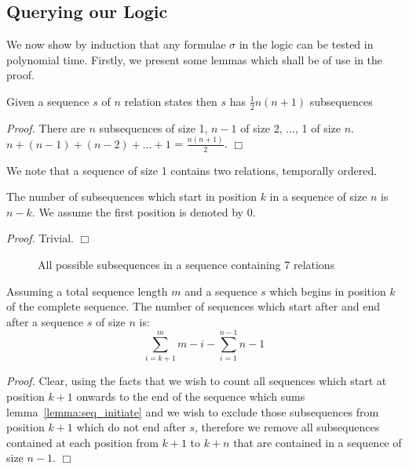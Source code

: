 \subsection{Querying our Logic}

We now show by induction that any formulae $\sigma$ in the logic can be tested
in polynomial time. Firstly, we present some lemmas which shall be of use
in the proof.


\begin{lemma}\label{lemma:subseq}
\begin{rm}
Given a sequence $s$ of $n$ relation states then $s$ has $\frac{1}{2}
n(n+1)$ subsequences
\end{rm}
\end{lemma}

{\em Proof.} There are $n$ subsequences of size 1, $n-1$ of size 2,
$\ldots$, 1 of size $n$. $n + (n-1) + (n-2) + \ldots + 1$ = $\frac{n(n+1)}{2}$. $\Box$

We note that a sequence of size 1 contains two relations, temporally
ordered. 
\begin{lemma}\label{lemma:seq_initiate}
\begin{rm}
The number of subsequences which start in position $k$ in
a sequence of size $n$ is $n-k$. We assume the first position is
denoted by 0.
\end{rm}
\end{lemma}

{\em Proof.} Trivial. $\Box$


\begin{figure}[ht]
\centerline{}
\caption{\label{fig:sequence} All possible subsequences in a sequence
containing 7 relations}
\end{figure}


\begin{lemma}\label{lemma:seq_extend}
\begin{rm}
Assuming a total sequence length $m$ and a sequence $s$ which begins
in position $k$ of the complete sequence. The number of sequences
which start after and end after a sequence $s$ of size $n$ is:  
\[
\sum_{i = k+1}^{m} m - i - \sum_{i = 1}^{n-1} n - 1
\]
\end{rm}
\end{lemma}

{\em Proof.} Clear, using the facts that we wish to count all
sequences which start at position $k+1$ onwards to the end of the
sequence which sums lemma~\ref{lemma:seq_initiate} and we wish to
exclude those subsequences from position $k + 1$ which do not end
after $s$, therefore we remove all subsequences contained at each
position from $k+1$ to $k+n$ that are contained in a sequence of size
$n-1$. $\Box$  
 
